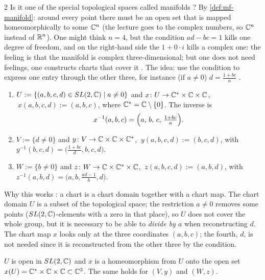 \begin{paracol}{2}
Is it one of the special topological spaces called manifolds ? By \cref{def:mf-manifold}: around every point there must be an open set that is mapped homeomorphically to some $\mathbb{C}^{n}$ (the lecture goes to the complex numbers, so $\mathbb{C}^n$ instead of $\mathbb{R}^n$). One might think $n=4$, but the condition $ad-bc=1$ kills one degree of freedom, and on the right-hand side the $1+0\cdot i$ kills a complex one: the feeling is that the manifold is complex three-dimensional; but one does not need feelings, one constructs charts that cover it    . The idea: use the condition to express one entry through the other three, for instance (if $a\ne0$) $d=\frac{1+bc}{a}$  .

\begin{definition}\label{def:sl-charts}
\begin{enumerate}
  \item[(U)] $U:=\{(a,b,c,d)\in SL(2,\mathbb{C})\mid a\ne0\}$ and $x\colon U\to\mathbb{C}^*\times\mathbb{C}\times\mathbb{C}$, $\ x(a,b,c,d):=(a,b,c)$, where $\mathbb{C}^*=\mathbb{C}\setminus\{0\}$. The inverse is
  \[
    x^{-1}(a,b,c)=\Bigl(a,\,b,\,c,\,\tfrac{1+bc}{a}\Bigr).
  \]
  \item[(V)] $V:=\{d\ne0\}$ and $y\colon V\to\mathbb{C}\times\mathbb{C}\times\mathbb{C}^*$, $\ y(a,b,c,d):=(b,c,d)$, with $y^{-1}(b,c,d)=\bigl(\tfrac{1+bc}{d},b,c,d\bigr)$.
  \item[(W)] $W:=\{b\ne0\}$ and $z\colon W\to\mathbb{C}\times\mathbb{C}^*\times\mathbb{C}$, $\ z(a,b,c,d):=(a,b,d)$, with $z^{-1}(a,b,d)=\bigl(a,b,\tfrac{ad-1}{b},d\bigr)$.
\end{enumerate}
\end{definition}
Why this works       : a chart is a chart domain together with a chart map. The chart domain $U$ is a subset of the topological space; the restriction $a\ne0$ removes some points ($SL(2,\mathbb{C})$-elements with a zero in that place), so $U$ does not cover the whole group, but it is necessary to be able to \emph{divide by $a$} when reconstructing $d$. The chart map $x$ looks only at the three coordinates $(a,b,c)$; the fourth, $d$, is not needed since it is reconstructed from the other three by the condition.
\begin{proposition}[$(U,x)$ is a chart]\label{prop:sl-chart}
$U$ is open in $SL(2,\mathbb{C})$ and $x$ is a homeomorphism from $U$ onto the open set $x(U)=\mathbb{C}^*\times\mathbb{C}\times\mathbb{C}\subset\mathbb{C}^3$. The same holds for $(V,y)$ and $(W,z)$.

\end{proposition}
\end{paracol}

